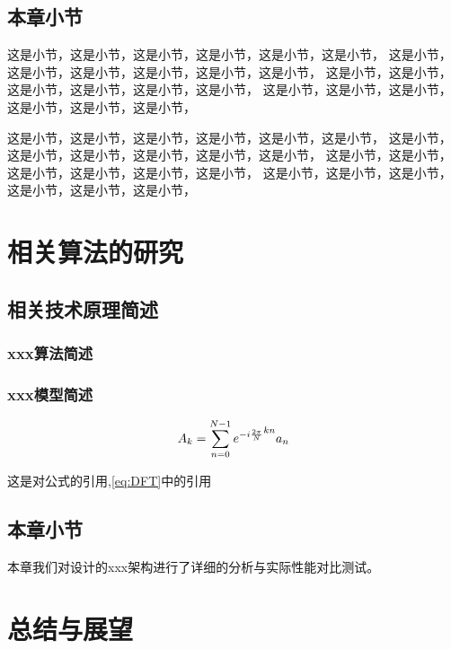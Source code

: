 \documentclass[UTF8,openright]{ctexbook}
\begin{document}
\section {本章小节}


这是小节，这是小节，这是小节，这是小节，这是小节，这是小节，
这是小节，这是小节，这是小节，这是小节，这是小节，这是小节，
这是小节，这是小节，这是小节，这是小节，这是小节，这是小节，
这是小节，这是小节，这是小节，这是小节，这是小节，这是小节，

这是小节，这是小节，这是小节，这是小节，这是小节，这是小节，
这是小节，这是小节，这是小节，这是小节，这是小节，这是小节，
这是小节，这是小节，这是小节，这是小节，这是小节，这是小节，
这是小节，这是小节，这是小节，这是小节，这是小节，这是小节，

\clearpage %

\chapter {相关算法的研究}


\section {相关技术原理简述}


\subsection {xxx算法简述}\label{section:acoustic-feat}

\subsection {xxx模型简述}



\begin{equation}
\label{eq:DFT}
A_k = \sum_{n=0}^{N-1} {e^{-i {2 \pi \over N}}}^{kn} a_n 
\end{equation}


这是对公式的引用,\autoref{eq:DFT}中的引用

\section{本章小节}

本章我们对设计的xxx架构进行了详细的分析与实际性能对比测试。



\chapter {总结与展望}
\end{document}
